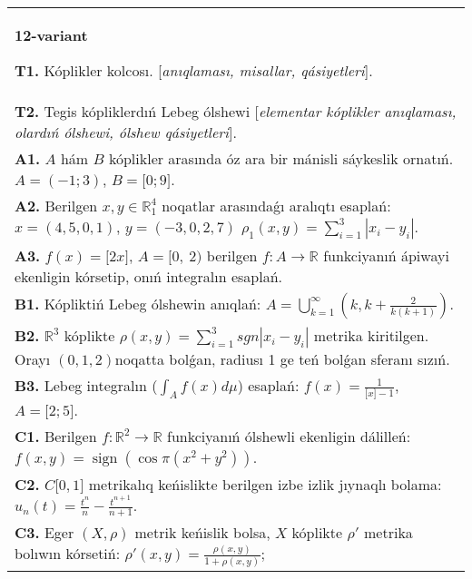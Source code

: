\documentclass{article}
\DeclareMathOperator{\sign}{sign}
\begin{document}
\begin{tabular}{m{17cm}}
\textbf{12-variant}
\newline

\textbf{T1.} Kóplikler kolcosı. [\textit{anıqlaması, misallar, qásiyetleri}]. \\
\textbf{T2.} Tegis kópliklerdıń Lebeg ólshewi [\textit{elementar kóplikler anıqlaması, olardıń ólshewi, ólshew qásiyetleri}]. \\
\textbf{A1.} \(A\) hám \(B\) kóplikler arasında óz ara bir mánisli sáykeslik ornatıń. \(A = ( - 1;3)\), \(B = \lbrack 0;9\rbrack\). \\
\textbf{A2.} Berilgen \(x,y \in \mathbb{R}_1^{4}\) noqatlar arasındaǵı aralıqtı esaplań: \(x = (4,5,0,1)\), \(y = ( - 3,0,2,7)\) \(\rho_{1}(x,y) = \sum_{i = 1}^{3}\left| x_{i} - y_{i} \right|\). \\
\textbf{A3.} \(f(x) = \lbrack 2x\rbrack\), \(A = \lbrack 0,\ 2)\) berilgen \(f:A\rightarrow\mathbb{R}\) funkciyanıń ápiwayi ekenligin kórsetip, onıń integralın esaplań. \\
\textbf{B1.} Kópliktiń Lebeg ólshewin anıqlań: \(A = \bigcup_{k = 1}^{\infty}\left( k,k + \frac{2}{k(k + 1)} \right)\). \\
\textbf{B2.} \(\mathbb{R}^{3}\) kóplikte \(\rho(x,y) = \sum_{i = 1}^{3}{sgn\left| x_{i} - y_{i} \right|}\) metrika kiritilgen. Orayı \((0,1,2)\)noqatta bolǵan, radiusı 1 ge teń bolǵan sferanı sızıń. \\
\textbf{B3.} Lebeg integralın (\(\int_{A}^{}{f(x)d\mu}\)) esaplań: \(f(x) = \frac{1}{\lbrack x\rbrack - 1}\), \(A = \lbrack 2;5\rbrack\). \\
\textbf{C1.} Berilgen \(f:\mathbb{R}^{2}\mathbb{\rightarrow R}\) funkciyanıń ólshewli ekenligin dálilleń: \(f(x,y) = \sign\left( \cos\pi\left( x^{2} + y^{2} \right) \right)\). \\
\textbf{C2.} \(C\lbrack 0,1\rbrack\) metrikalıq keńislikte berilgen izbe izlik jıynaqlı bolama: \(u_{n}(t) = \frac{t^{n}}{n} - \frac{t^{n + 1}}{n + 1}\). \\
\textbf{C3.} Eger \((X,\rho)\) metrik keńislik bolsa, \(X\) kóplikte \(\rho'\) metrika bolıwın kórsetiń: \(\rho'(x,y) = \frac{\rho(x,y)}{1 + \rho(x,y)}\); \\

\end{tabular}
\vspace{1cm}
\end{document}
